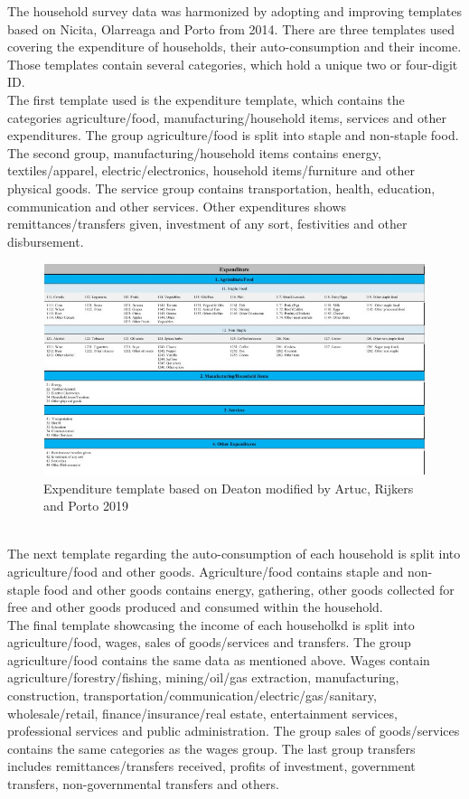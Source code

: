The household survey data was harmonized by adopting and improving templates based on Nicita, Olarreaga and Porto from 2014.
There are three templates used covering the expenditure of households, their auto-consumption and their income. Those templates 
contain several categories, which hold a unique two or four-digit ID. \\
The first template used is the expenditure template, which
contains the categories agriculture/food, manufacturing/household items, services and other expenditures. The group agriculture/food
is split into staple and non-staple food. The second group, manufacturing/household items contains energy, textiles/apparel,
electric/electronics, household items/furniture and other physical goods. The service group contains transportation, health,
education, communication and other services. Other expenditures shows remittances/transfers given, investment of any sort,
festivities and other disbursement.\\
\begin{figure}[h!]
    \centering
    \includegraphics*[width=\textwidth]{graphics/templ1.jpg}
    \caption{Expenditure template based on Deaton modified by Artuc, Rijkers and Porto 2019}
    \label{fig:template exp}
\end{figure}\\
The next template regarding the auto-consumption of each household is split into agriculture/food and other goods. Agriculture/food
contains staple and non-staple food and other goods contains energy, gathering, other goods collected for free and other goods
produced and consumed within the household.\\

The final template showcasing the income of each householkd is split into agriculture/food, wages, sales of goods/services and 
transfers. The group agriculture/food contains the same data as mentioned above. Wages contain agriculture/forestry/fishing,
mining/oil/gas extraction, manufacturing, construction, transportation/communication/electric/gas/sanitary, wholesale/retail,
finance/insurance/real estate, entertainment services, professional services and public administration. The group sales of
goods/services contains the same categories as the wages group. The last group transfers includes remittances/transfers received,
profits of investment, government transfers, non-governmental transfers and others. \\

